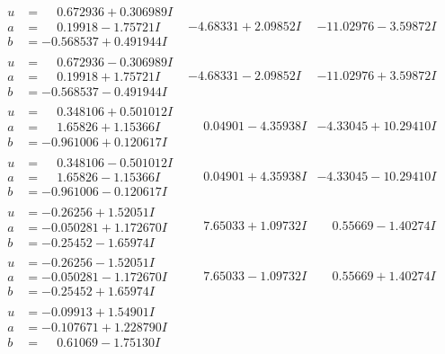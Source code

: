 \documentclass[1p]{elsarticle_modified}
\theoremstyle{definition}
\begin{document}
$$\begin{array}{c|c|c}
\begin{aligned}
u &= \phantom{-}0.672936 + 0.306989 I \\
a &= \phantom{-}0.19918 - 1.75721 I \\
b &= -0.568537 + 0.491944 I\end{aligned}
 & -4.68331 + 2.09852 I & -11.02976 - 3.59872 I \\ \hline\begin{aligned}
u &= \phantom{-}0.672936 - 0.306989 I \\
a &= \phantom{-}0.19918 + 1.75721 I \\
b &= -0.568537 - 0.491944 I\end{aligned}
 & -4.68331 - 2.09852 I & -11.02976 + 3.59872 I \\ \hline\begin{aligned}
u &= \phantom{-}0.348106 + 0.501012 I \\
a &= \phantom{-}1.65826 + 1.15366 I \\
b &= -0.961006 + 0.120617 I\end{aligned}
 & \phantom{-}0.04901 - 4.35938 I & -4.33045 + 10.29410 I \\ \hline\begin{aligned}
u &= \phantom{-}0.348106 - 0.501012 I \\
a &= \phantom{-}1.65826 - 1.15366 I \\
b &= -0.961006 - 0.120617 I\end{aligned}
 & \phantom{-}0.04901 + 4.35938 I & -4.33045 - 10.29410 I \\ \hline\begin{aligned}
u &= -0.26256 + 1.52051 I \\
a &= -0.050281 + 1.172670 I \\
b &= -0.25452 - 1.65974 I\end{aligned}
 & \phantom{-}7.65033 + 1.09732 I & \phantom{-}0.55669 - 1.40274 I \\ \hline\begin{aligned}
u &= -0.26256 - 1.52051 I \\
a &= -0.050281 - 1.172670 I \\
b &= -0.25452 + 1.65974 I\end{aligned}
 & \phantom{-}7.65033 - 1.09732 I & \phantom{-}0.55669 + 1.40274 I \\ \hline\begin{aligned}
u &= -0.09913 + 1.54901 I \\
a &= -0.107671 + 1.228790 I \\
b &= \phantom{-}0.61069 - 1.75130 I\end{aligned}

\end{array}$$
\end{document}
